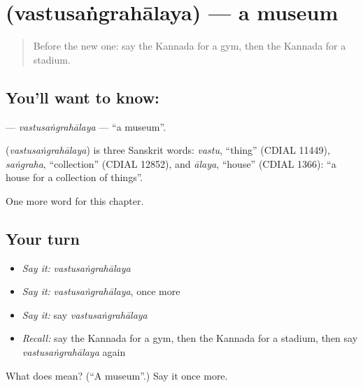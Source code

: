 \section[\texorpdfstring{\kn{ವಸ್ತುಸಂಗ್ರಹಾಲಯ} (vastusaṅgrahālaya)}{ವಸ್ತುಸಂಗ್ರಹಾಲಯ (vastusaṅgrahālaya)}]{ (vastusaṅgrahālaya) — a museum}

\label{lesson:KA-C213-vastusangrahalaya}



\begin{quote}
Before the new one: say the Kannada for a gym, then the Kannada for a stadium.
\end{quote}

\subsection*{You'll want to know: }
\textbf{} — \emph{vastusaṅgrahālaya} — \textquotedblleft{}a museum\textquotedblright{}.

\begin{cousinweb}
\textbf{} (\emph{vastusaṅgrahālaya}) is three Sanskrit words: \emph{vastu}, \textquotedblleft{}thing\textquotedblright{} (CDIAL 11449), \emph{saṅgraha}, \textquotedblleft{}collection\textquotedblright{} (CDIAL 12852), and \emph{ālaya}, \textquotedblleft{}house\textquotedblright{} (CDIAL 1366): \textquotedblleft{}a house for a collection of things\textquotedblright{}.
\end{cousinweb}

\begin{grammarlens}[title={What you've built}]
One more word for this chapter.
\end{grammarlens}

\subsection*{Your turn}
\begin{itemize}
\raggedright
  \item \emph{Say it:} \emph{vastusaṅgrahālaya}
  \item \emph{Say it:} \emph{vastusaṅgrahālaya}, once more
  \item \emph{Say it:} say \emph{vastusaṅgrahālaya}
  \item \emph{Recall:} say the Kannada for a gym, then the Kannada for a stadium, then say \emph{vastusaṅgrahālaya} again
\end{itemize}

\begin{tcolorbox}[breakable,colback=teal!4,colframe=teal!35!black,title={Before you move on}]
What does  mean? (\textquotedblleft{}A museum\textquotedblright{}.) Say it once more.
\end{tcolorbox}
